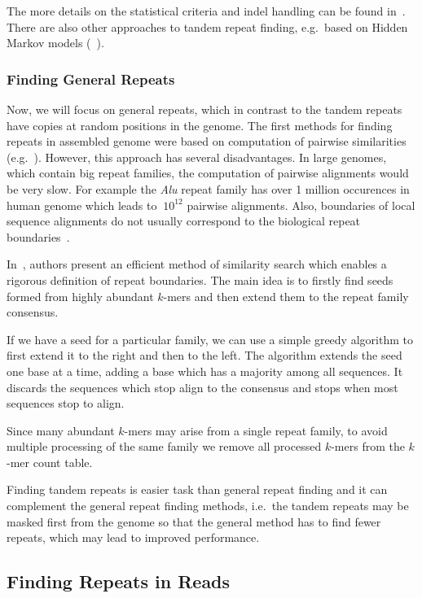 The more details on the statistical criteria and indel handling can be found in~\cite{trf}. There are also other approaches to tandem repeat finding, e.g.\ based on Hidden Markov models (~\cite{tantan, nanasi2014probabilistic}).

\subsubsection{Finding General Repeats}

Now, we will focus on general repeats, which in contrast to the tandem repeats have copies at random positions in the genome.
The first methods for finding repeats in assembled genome were based on computation of pairwise similarities (e.g.~\cite{reputer, repeatfinder, recon, repeatgluer, piler}). However, this approach has several disadvantages. In large genomes, which contain big repeat families, the computation of pairwise alignments would be very slow. For example the \textit{Alu} repeat family has over 1 million occurences in human genome which leads to $~10^{12}$ pairwise alignments.
Also, boundaries of local sequence alignments do not usually correspond to the biological repeat boundaries~\cite{recon}.

In~\cite{repscout}, authors present an efficient method of similarity search which enables a rigorous definition of repeat boundaries. The main idea is to firstly find seeds formed from highly abundant $k$-mers and then extend them to the repeat family consensus.

If we have a seed for a particular family, we can use a simple greedy algorithm to first extend it to the right and then to the left. The algorithm extends the seed one base at a time, adding a base which has a majority among all sequences. It discards the sequences which stop align to the consensus and stops when most sequences stop to align.

Since many abundant $k$-mers may arise from a single repeat family, to avoid multiple processing of the same family we remove all processed $k$-mers from the $k$-mer count table.

Finding tandem repeats is easier task than general repeat finding and it can complement the general repeat finding methods, i.e.\ the tandem repeats may be masked first from the genome so that the general method has to find fewer repeats, which may lead to improved performance.

\subsection{Finding Repeats in Reads}\label{sect:repeats-reads}


